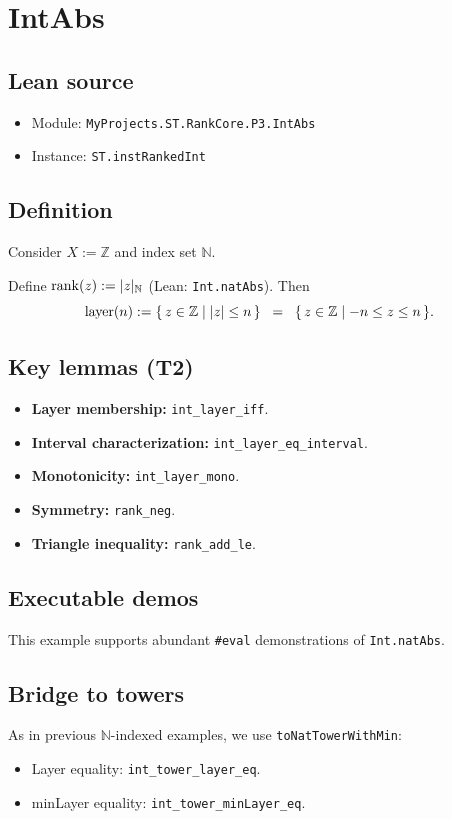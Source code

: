 \section{IntAbs}
\label{sec:ex-intabs}

\subsection{Lean source}
\begin{itemize}
\item Module: \texttt{MyProjects.ST.RankCore.P3.IntAbs}
\item Instance: \texttt{ST.instRankedInt}
\end{itemize}

\subsection{Definition}
Consider $X := \mathbb{Z}$ and index set $\mathbb{N}$.
\begin{definition}
Define $\operatorname{rank}(z) := |z|_{\mathbb{N}}$ (Lean: \texttt{Int.natAbs}).
Then
\[
  \operatorname{layer}(n) := \{\, z \in \mathbb{Z} \mid |z| \le n \,\}
  \;\;=\;\;
  \{\, z \in \mathbb{Z} \mid -n \le z \le n \,\}.
\]
\end{definition}

\subsection{Key lemmas (T2)}
\begin{itemize}
\item \textbf{Layer membership:} \texttt{int\_layer\_iff}.
\item \textbf{Interval characterization:} \texttt{int\_layer\_eq\_interval}.
\item \textbf{Monotonicity:} \texttt{int\_layer\_mono}.
\item \textbf{Symmetry:} \texttt{rank\_neg}.
\item \textbf{Triangle inequality:} \texttt{rank\_add\_le}.
\end{itemize}

\subsection{Executable demos}
This example supports abundant \texttt{\#eval} demonstrations of \texttt{Int.natAbs}.

\subsection{Bridge to towers}
As in previous $\mathbb{N}$-indexed examples, we use \texttt{toNatTowerWithMin}:
\begin{itemize}
\item Layer equality: \texttt{int\_tower\_layer\_eq}.
\item minLayer equality: \texttt{int\_tower\_minLayer\_eq}.
\end{itemize}


